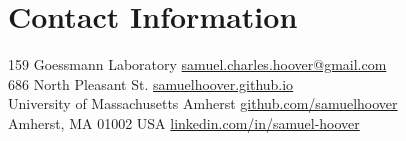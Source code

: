 \section{\sc Contact Information}
159 Goessmann Laboratory  \hfill \href{mailto:samuel.charles.hoover@gmail.com}{samuel.charles.hoover@gmail.com}\\
686 North Pleasant St.  \hfill  \href{https://samuelhoover.github.io}{samuelhoover.github.io}\\
University of Massachusetts Amherst \hfill \href{https://github.com/samuelhoover}{github.com/samuelhoover}\\
Amherst, MA 01002 USA \hfill \href{https://www.linkedin.com/in/samuel-hoover}{linkedin.com/in/samuel-hoover}\\



